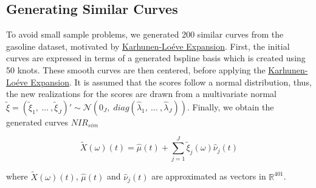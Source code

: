 \documentclass[11pt,twoside,a4paper]{article}
\begin{document}
	
	 
	 
		
	
	
	
	\subsection{Generating Similar Curves}
	To avoid small sample problems, we generated 200 similar curves from the gasoline dataset, motivated by \hyperlink{KL}{Karhunen-Lo\'{e}ve Expansion}. First, the initial curves are expressed in terms of a generated bspline basis which is created using 50 knots. These smooth curves are then centered, before applying the \hyperlink{KL}{Karhunen-Lo\'{e}ve Expansion}. It is assumed that the scores follow a normal distribution, thus, the new realizations for the scores are drawn from a multivariate normal $\tilde{\xi} = \left(\tilde{\xi}_{1},\: \dots \:, \tilde{\xi}_{J}\right)' \sim \mathcal{N}(0_J, \; diag(\hat{\lambda}_1,\: \dots\:, \hat{\lambda}_J))$. Finally, we obtain the generated curves $NIR_{sim}$
	
	
		$$\tilde{X}(\omega)(t) = \hat{\mu}(t) + \sum_{j = 1}^{J} \tilde{\xi}_j(\omega) \hat{\nu}_j(t)$$ 

		where
			$\tilde{X}(\omega)(t)$, $\hat{\mu}(t)$ and $\hat{\nu}_j(t)$ are approximated as vectors in $\mathbb{R}^{401}$.
		
	
    
\end{document}
